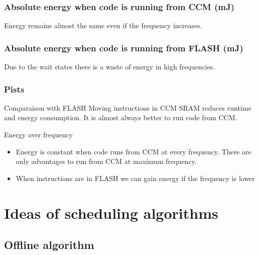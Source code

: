 \documentclass[
	11pt, %
]{beamer}
\begin{document}
\begin{frame}
	\frametitle{Absolute energy when code is running from CCM (mJ)}
	
	Energy remains almost the same even if the frequency increases.
\end{frame}

\begin{frame}
	\frametitle{Absolute energy when code is running from FLASH (mJ)}
	
	Due to the wait states there is a waste of energy in high frequencies.
\end{frame}

\begin{frame}
	\frametitle{Pists}
	\begin{block}{Comparaison with FLASH} %
		Moving instructions in CCM SRAM reduces runtime and energy consumption.
		It is almost always better to run code from CCM.
	\end{block}
	\begin{block}{Energy over frequency} %
		\begin{itemize}
			\item Energy is constant when code runs from CCM at every frequency. There are
			only advantages to run from CCM at maximum frequency.
			\item When instructions are in FLASH we can gain energy if the
			frequency is lower
		\end{itemize}
	\end{block}
\end{frame}

\section{Ideas of scheduling algorithms}

\subsection{Offline algorithm}
\end{document}
